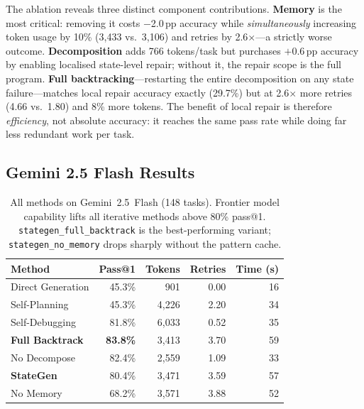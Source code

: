 \documentclass[11pt,twocolumn]{article}
\begin{document}
The ablation reveals three distinct component contributions.
\textbf{Memory} is the most critical: removing it costs $-$2.0\,pp accuracy
while \emph{simultaneously} increasing token usage by 10\% (3,433 vs.\ 3,106)
and retries by 2.6$\times$---a strictly worse outcome.
\textbf{Decomposition} adds 766 tokens/task but purchases $+$0.6\,pp accuracy
by enabling localised state-level repair; without it, the repair scope is the
full program.
\textbf{Full backtracking}---restarting the entire decomposition on any state
failure---matches local repair accuracy exactly (29.7\%) but at 2.6$\times$
more retries (4.66 vs.\ 1.80) and 8\% more tokens. The benefit of local
repair is therefore \emph{efficiency}, not absolute accuracy: it reaches the
same pass rate while doing far less redundant work per task.

\subsection{Gemini 2.5 Flash Results}

\begin{table}[H]
\centering
\caption{All methods on Gemini~2.5~Flash (148 tasks). Frontier model
capability lifts all iterative methods above 80\% pass@1.
\texttt{stategen\_full\_backtrack} is the best-performing variant;
\texttt{stategen\_no\_memory} drops sharply without the pattern cache.}
\label{tab:gemini}
\setlength{\tabcolsep}{4pt}
\begin{tabular}{lrrrr}
\toprule
\textbf{Method} & \textbf{Pass@1} & \textbf{Tokens} & \textbf{Retries} & \textbf{Time (s)} \\
\midrule
Direct Generation         & 45.3\% & 901    & 0.00 & 16 \\
Self-Planning             & 45.3\% & 4,226  & 2.20 & 34 \\
Self-Debugging            & 81.8\% & 6,033  & 0.52 & 35 \\
\textbf{Full Backtrack}   & \textbf{83.8\%} & 3,413 & 3.70 & 59 \\
No Decompose              & 82.4\% & 2,559  & 1.09 & 33 \\
\textbf{StateGen}         & 80.4\% & 3,471  & 3.59 & 57 \\
No Memory                 & 68.2\% & 3,571  & 3.88 & 52 \\
\bottomrule
\end{tabular}
\end{table}
\end{document}
